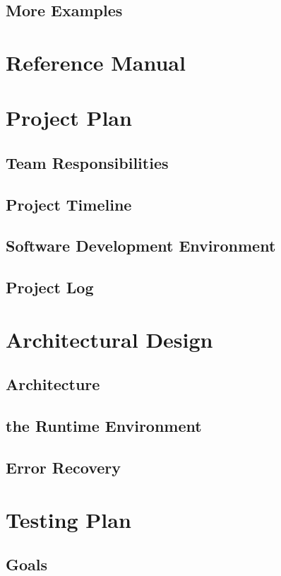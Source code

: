     \subsection{More Examples}

\section{Reference Manual}


\section{Project Plan}
    \subsection{Team Responsibilities}
    \subsection{Project Timeline}
    \subsection{Software Development Environment}
    \subsection{Project Log}
    
\section{Architectural Design}
    \subsection{Architecture}
    \subsection{the Runtime Environment}
    \subsection{Error Recovery}

\section{Testing Plan}
    \subsection{Goals}
